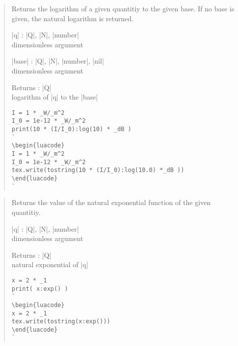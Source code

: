 \documentclass{ltxdoc}
\begin{document}
\begin{quote}
  Returns the logarithm of a given quantitiy to the given base. If no base is given, the natural logarithm is returned.

  \begin{description}
  \item |q| : |Q|, |N|, |number|\\
    dimensionless argument

  \item |base| : |Q|, |N|, |number|, |nil|\\
    dimensionless argument

  \item Returns : |Q|\\
    logarithm  of |q| to the |base|
  \end{description}


\begin{lstlisting}
I = 1 * _W/_m^2
I_0 = 1e-12 * _W/_m^2
print(10 * (I/I_0):log(10) * _dB )
`
\begin{luacode}
I = 1 * _W/_m^2
I_0 = 1e-12 * _W/_m^2
tex.write(tostring(10 * (I/I_0):log(10.0) *_dB ))
\end{luacode}
`
\end{lstlisting}
\end{quote}




\begin{quote}
  Returns the value of the natural exponential function of the given quantitiy.

  \begin{description}
  \item |q| : |Q|, |N|, |number|\\
    dimensionless argument

  \item Returns : |Q|\\
    natural exponential of |q|
  \end{description}

\begin{lstlisting}
x = 2 * _1
print( x:exp() )
`
\begin{luacode}
x = 2 * _1
tex.write(tostring(x:exp()))
\end{luacode}
`
\end{lstlisting}

\end{quote}
\end{document}
